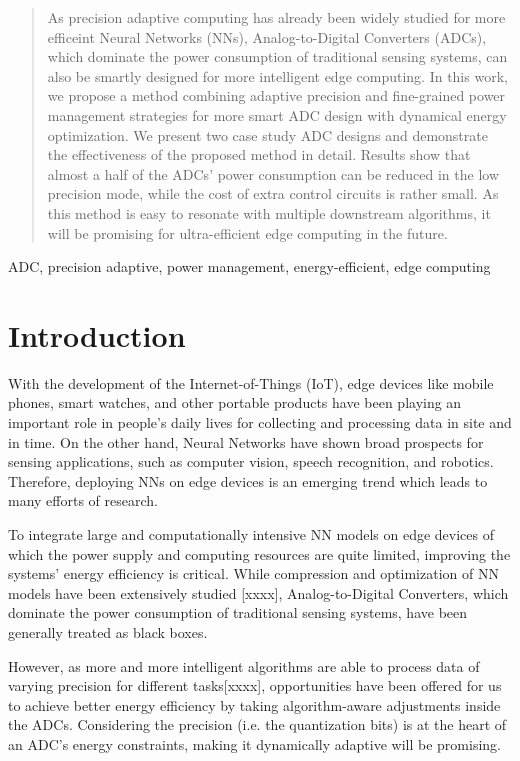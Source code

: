 \documentclass[conference]{IEEEtran}
\begin{document}
\begin{abstract}
As precision adaptive computing has already been widely studied for more efficeint Neural Networks (NNs), Analog-to-Digital Converters (ADCs), which dominate the power consumption of traditional sensing systems, can also be smartly designed for more intelligent edge computing. In this work, we propose a method combining adaptive precision and fine-grained power management strategies for more smart ADC design with dynamical energy optimization. We present two case study ADC designs and demonstrate the effectiveness of the proposed method in detail. Results show that almost a half of the ADCs’ power consumption can be reduced in the low precision mode, while the cost of extra control circuits is rather small. As this method is easy to resonate with multiple downstream algorithms, it will be promising for ultra-efficient edge computing in the future.
\end{abstract}

\begin{IEEEkeywords}
ADC, precision adaptive, power management, energy-efficient, edge computing
\end{IEEEkeywords}

\section{Introduction}

With the development of the Internet-of-Things (IoT), edge devices like mobile phones, smart watches, and other portable products have been playing an important role in people’s daily lives for collecting and processing data in site and in time. On the other hand, Neural Networks have shown broad prospects for sensing applications, such as computer vision, speech recognition, and robotics. Therefore, deploying NNs on edge devices is an emerging trend which leads to many efforts of research. 

To integrate large and computationally intensive NN models on edge devices of which the power supply and computing resources are quite limited, improving the systems' energy efficiency is critical. While compression and optimization of NN models have been extensively studied [xxxx], Analog-to-Digital Converters, which dominate the power consumption of traditional sensing systems, have been generally treated as black boxes. 

However, as more and more intelligent algorithms are able to process data of varying precision for different tasks[xxxx], opportunities have been offered for us to achieve better energy efficiency by taking algorithm-aware adjustments inside the ADCs. Considering the precision (i.e. the quantization bits) is at the heart of an ADC’s energy constraints, making it dynamically adaptive will be promising.
\end{document}
